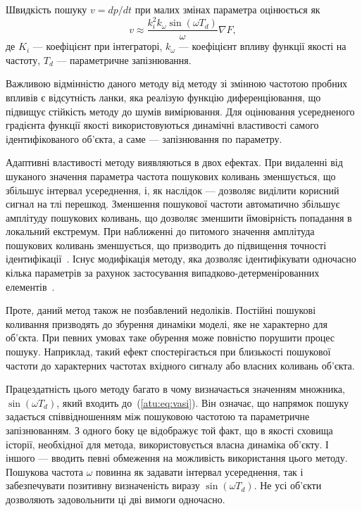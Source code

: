 Швидкість пошуку
$ v = dp / dt $ при малих змінах параметра оцінюється як
%
\begin{equation}
\label{atu:eq:vasi}
  v
  \approx
  \frac{k_i^2 k_\omega \sin(\omega T_d) }{\omega} \nabla {F},
\end{equation}
%
де
$ K_i $ --- коефіцієнт при інтеграторі,
$ k_\omega $ --- коефіцієнт впливу функції якості на частоту,
$ T_d $ --- параметричне запізнювання.

Важливою відмінністю даного методу від методу зі змінною
частотою пробних впливів є відсутність
ланки, яка реалізую функцію
диференціювання,
що підвищує стійкість методу до шумів вимірювання. Для
оцінювання усередненого градієнта функції якості
використовуються динамічні властивості самого
ідентифікованого об'єкта, а саме --- запізнювання по параметру.

Адаптивні властивості методу виявляються в двох ефектах. При
видаленні від шуканого значення параметра частота пошукових
коливань зменшується, що збільшує інтервал усереднення,
і, як наслідок --- дозволяє виділити корисний сигнал на тлі
перешкод. Зменшення пошукової частоти автоматично збільшує
амплітуду пошукових коливань, що дозволяє зменшити ймовірність
попадання в локальний екстремум. При наближенні до питомого
значення амплітуда пошукових коливань зменшується, що
призводить до підвищення точності
ідентифікації~\cite{mai_sear_meth_akt_id_ns,mai_syntez_adop_id,bodyan_adapt_viyavl}.
Існує модифікація методу, яка дозволяє ідентифікувати
одночасно кілька параметрів за рахунок застосування
випадково-детерменірованних елементів~\cite{mich_92, mich_upr_prost_mech}.

Проте, даний метод також не позбавлений недоліків. Постійні
пошукові коливання призводять до збурення динаміки моделі,
яке не характерно для об'єкта. При певних умовах таке обурення
може повністю порушити процес пошуку. Наприклад, такий
ефект спостерігається при близькості пошукової частоти до
характерних частотах вхідного сигналу або власних коливань
об'єкта.

Працездатність цього методу багато в чому визначається
значенням множника,
$ \sin(\omega T_d)$, який входить до~(\ref{atu:eq:vasi}).
Він означає, що напрямок пошуку задається
співвідношенням між пошуковою частотою та параметричне запізнюванням.
З одного боку це відображує той факт, що в якості сховища історії,
необхідної для метода, використовується власна динаміка об'єкту.
І іншого --- вводить певні
обмеження на можливість використання цього методу.
Пошукова частота $\omega$ повинна як задавати інтервал усереднення,
так і забезпечувати
позитивну визначеність виразу $ \sin(\omega T_d)$.
Не усі об'єкти дозволяють
задовольнити ці дві вимоги одночасно.







